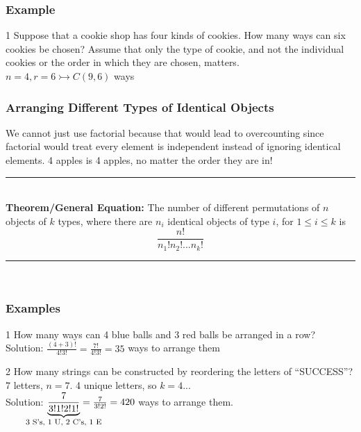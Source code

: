 \documentclass[12pt, letterpaper]{article}
\newcommand{\exheader}[1][ex]{{\tiny{#1}\normalsize}}
\newcommand{\horizline}[0]{\noindent\rule{\textwidth}{1pt}\\}
\begin{document}


\subsubsection*{Example}

\exheader[1] Suppose that a cookie shop has four kinds of cookies. How many ways can six cookies be chosen? Assume that only the type of cookie, and not the individual cookies or the order in which they are chosen, matters. \\ 
\hspace*{0.25cm} $n = 4, r=6  \rightarrowtail C(9,6)$ ways

\pagebreak

\subsubsection{Arranging Different Types of Identical Objects}
We cannot just use factorial because that would lead to overcounting since factorial would treat every element is independent instead of ignoring identical elements. 4 apples is 4 apples, no matter the order they are in!

\horizline
\textbf{Theorem/General Equation:} The number of different permutations of $n$ objects of $k$ types, where there are $n_i$ identical objects of type $i$, for $1 \le i \le k$ is \[\frac{n!}{n_1!n_2!...n_k!} \]
\vspace*{-0.5cm} \horizline \vspace*{-0.5cm}
\bigbreak

\subsubsection*{Examples} 
\bigbreak

\exheader[1] How many ways can 4 blue balls and 3 red balls be arranged in a row? \\
\hspace*{0.25cm} Solution: $\frac{(4+3)!}{4!3!} = \frac{7!}{4!3!} = 35$ ways to arrange them 

\bigbreak

\exheader[2] How many strings can be constructed by reordering the letters of “SUCCESS”? \\ 
\hspace*{0.25cm} 7 letters, $n=7$. 4 unique letters, so $k=4$... \\ 
\hspace*{0.25cm} Solution: $  \underbrace{\frac{7}{3!1!2!1!}}_{\makebox[0pt]{\footnotesize 3 S's, 1 U, 2 C's, 1 E}} = \frac{7}{3!2!} = 420$ ways to arrange them.
\end{document}
